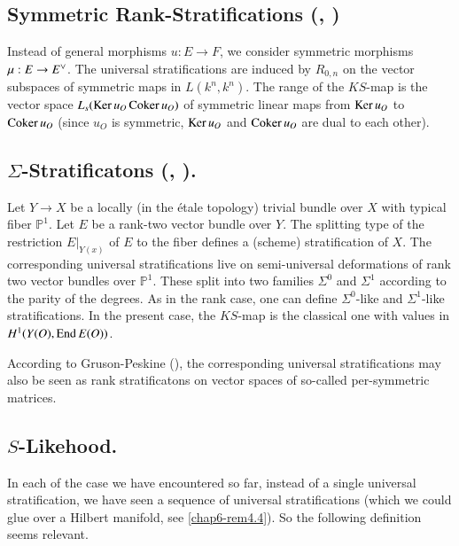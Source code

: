 \subsection{Symmetric Rank-Stratifications
(\texorpdfstring{\cite{chap6-C}, \cite{chap6-B4}}{Cite})}\label{chap6-sec5.1}\pageoriginale

Instead of general morphisms $u:E\to F$, we consider symmetric
morphisms $\mu:E\to E\spcheck$. The universal stratifications are
induced by $R_{0,n}$ on the vector subspaces of symmetric maps in
$L(k^{n},k^{n})$. The range of the $KS$-map is the vector space
$L_{s}(\operatorname{Ker} u_{O}\operatorname{Coker} u_{O})$ of symmetric linear maps from $\operatorname{Ker}
u_{O}$ to $\operatorname{Coker} u_{O}$ (since $u_{O}$ is symmetric, $\operatorname{Ker} u_{O}$ and
$\operatorname{Coker} u_{O}$ are dual to each other). 

\subsection{\texorpdfstring{$\Sigma$}{S}-Stratificatons
(\texorpdfstring{\cite{chap6-Mu}, \cite{chap6-Su}}{Cite}).}\label{chap6-sec5.2} 

Let $Y\to X$ be a locally (in the \'etale topology) trivial bundle
over $X$ with typical fiber $\mathbb{P}^{1}$. Let $E$ be a rank-two
vector bundle over $Y$. The splitting type of the restriction
$E|_{Y(x)}$ of $E$ to the fiber defines a (scheme) stratification of
$X$. The corresponding universal stratifications live on
semi-universal deformations of rank two vector bundles over
$\mathbb{P}^{1}$. These split into two families $\Sigma^{0}$ and
$\Sigma^{1}$ according to the parity of the degrees. As in the rank
case, one can define $\Sigma^{0}$-like and $\Sigma^{1}$-like
stratifications. In the present case, the $KS$-map is the classical
one with values in $H^{1}(Y(O), \operatorname{End} E(O))$.

According to Gruson-Peskine (\cite[p.1]{chap6-GP3}), the corresponding
universal stratifications may also be seen as rank stratificatons on
vector spaces of so-called per-symmetric matrices. 

\subsection{\texorpdfstring{$S$}{S}-Likehood.}\label{chap6-sec5.3}

In each of the case we have encountered so far, instead of a single
universal stratification, we have seen a sequence of universal
stratifications (which we could glue over a Hilbert manifold,
see \ref{chap6-rem4.4}). So the following definition seems relevant. 


